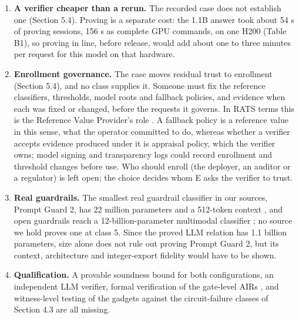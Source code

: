 \documentclass[11pt]{article}
\begin{document}
\begin{enumerate}
\item \textbf{A verifier cheaper than a rerun.} The recorded case does not establish one (Section 5.4). Proving is a separate cost: the 1.1B answer took about 54 s of proving sessions, 156 s as complete GPU commands, on one H200 (Table B1), so proving in line, before release, would add about one to three minutes per request for this model on that hardware.
\item \textbf{Enrollment governance.} The case moves residual trust to enrollment (Section 5.4), and no class supplies it. Someone must fix the reference classifiers, thresholds, model roots and fallback policies, and evidence when each was fixed or changed, before the requests it governs. In RATS terms this is the Reference Value Provider's role \cite{B5}. A fallback policy is a reference value in this sense, what the operator committed to do, whereas whether a verifier accepts evidence produced under it is appraisal policy, which the verifier owns; model signing \cite{C22} and transparency logs \cite{C18} could record enrollment and threshold changes before use. Who should enroll (the deployer, an auditor or a regulator) is left open; the choice decides whom E asks the verifier to trust.
\item \textbf{Real guardrails.} The smallest real guardrail classifier in our sources, Prompt Guard 2, has 22 million parameters and a 512-token context \cite{D6}, and open guardrails reach a 12-billion-parameter multimodal classifier \cite{D4}; no source we hold proves one at class 5. Since the proved LLM relation has 1.1 billion parameters, size alone does not rule out proving Prompt Guard 2, but its context, architecture and integer-export fidelity would have to be shown.
\item \textbf{Qualification.} A provable soundness bound for both configurations, an independent LLM verifier, formal verification of the gate-level AIRs \cite{A30}, and witness-level testing of the gadgets against the circuit-failure classes of Section 4.3 \cite{F1} are all missing.

\end{enumerate}
\end{document}
